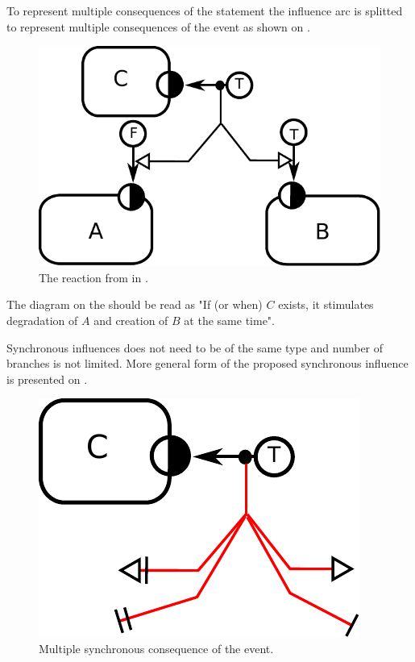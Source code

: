 To represent multiple consequences of the statement the influence arc is splitted to represent multiple consequences of the event as shown on . 

\begin{figure}[H]
  \centering
  \includegraphics[scale = 0.75]{images/synchronous}
  \caption{The reaction from  in \ER.}
  \label{fig:synchronous}
\end{figure}

The diagram on the  should be read as "If (or when) $C$ exists, it stimulates degradation of $A$ and creation of $B$ at the same time". 

Synchronous influences does not need to be of the same type and number of branches is not limited. More general form of the proposed synchronous influence is presented on .

\begin{figure}[H]
  \centering
  \includegraphics[scale = 0.75]{images/simultaneous}
  \caption{Multiple synchronous consequence of the event.}
  \label{fig:simultaneous}
\end{figure}


